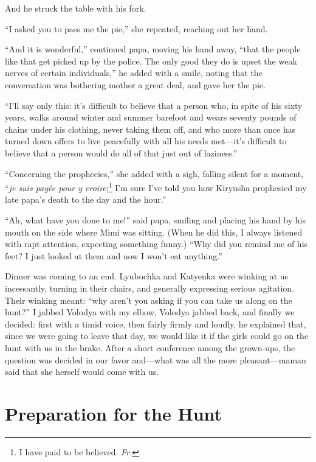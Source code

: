 And he struck the table with his fork.

``I asked you to pass me the pie,'' she repeated, reaching out her hand.

``And it is wonderful,'' continued papa, moving his hand away, ``that the people like that get picked up by the police. The only good they do is upset the weak nerves of certain individuals,'' he added with a smile, noting that the conversation was bothering mother a great deal, and gave her the pie.

``I'll say only this: it's difficult to believe that a person who, in spite of his sixty years, walks around winter and summer barefoot and wears seventy pounds of chains under his clothing, never taking them off, and who more than once has turned down offers to live peacefully with all his needs met---it's difficult to believe that a person would do all of that just out of laziness.'' %

``Concerning the prophecies,'' she added with a sigh, falling silent for a moment, ``\textit{je suis pay\'ee pour y croire};\footnote{I have paid to be believed. \textit{Fr.}}  I'm sure I've told you how Kiryusha prophesied my late papa's death to the day and the hour.'' %

``Ah, what have you done to me!'' said papa, smiling and placing his hand by his mouth on the side where Mimi was sitting. (When he did this, I always listened with rapt attention, expecting something funny.) ``Why did you remind me of his feet? I just looked at them and now I won't eat anything.'' %

Dinner was coming to an end. Lyubochka and Katyenka were winking at us incessantly, turning in their chairs, and generally expressing serious agitation. Their winking meant: ``why aren't you asking if you can take us along on the hunt?'' I jabbed Volodya with my elbow, Volodya jabbed back, and finally we decided: first with a timid voice, then fairly firmly and loudly, he explained that, since we were going to leave that day, we would like it if the girls could go on the hunt with us in the brake.  After a short conference among the grown-ups, the question was decided in our favor and---what was all the more pleasant---maman said that she herself would come with us.

\chapter{Preparation for the Hunt}

